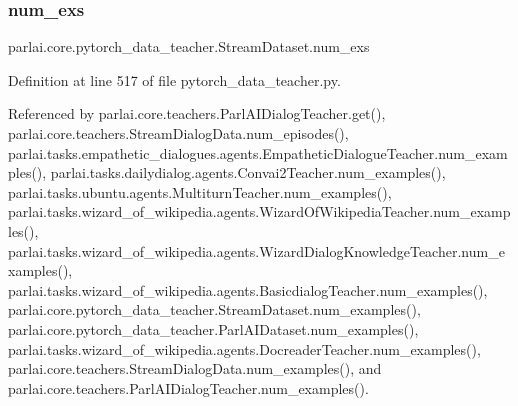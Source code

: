 \mbox{\label{classparlai_1_1core_1_1pytorch__data__teacher_1_1StreamDataset_a2155bdd1c8cd3723c252ea05aa859a8c}} 
\subsubsection{\texorpdfstring{num\+\_\+exs}{num\_exs}}
{\footnotesize\ttfamily parlai.\+core.\+pytorch\+\_\+data\+\_\+teacher.\+Stream\+Dataset.\+num\+\_\+exs}



Definition at line 517 of file pytorch\+\_\+data\+\_\+teacher.\+py.



Referenced by parlai.\+core.\+teachers.\+Parl\+A\+I\+Dialog\+Teacher.\+get(), parlai.\+core.\+teachers.\+Stream\+Dialog\+Data.\+num\+\_\+episodes(), parlai.\+tasks.\+empathetic\+\_\+dialogues.\+agents.\+Empathetic\+Dialogue\+Teacher.\+num\+\_\+examples(), parlai.\+tasks.\+dailydialog.\+agents.\+Convai2\+Teacher.\+num\+\_\+examples(), parlai.\+tasks.\+ubuntu.\+agents.\+Multiturn\+Teacher.\+num\+\_\+examples(), parlai.\+tasks.\+wizard\+\_\+of\+\_\+wikipedia.\+agents.\+Wizard\+Of\+Wikipedia\+Teacher.\+num\+\_\+examples(), parlai.\+tasks.\+wizard\+\_\+of\+\_\+wikipedia.\+agents.\+Wizard\+Dialog\+Knowledge\+Teacher.\+num\+\_\+examples(), parlai.\+tasks.\+wizard\+\_\+of\+\_\+wikipedia.\+agents.\+Basicdialog\+Teacher.\+num\+\_\+examples(), parlai.\+core.\+pytorch\+\_\+data\+\_\+teacher.\+Stream\+Dataset.\+num\+\_\+examples(), parlai.\+core.\+pytorch\+\_\+data\+\_\+teacher.\+Parl\+A\+I\+Dataset.\+num\+\_\+examples(), parlai.\+tasks.\+wizard\+\_\+of\+\_\+wikipedia.\+agents.\+Docreader\+Teacher.\+num\+\_\+examples(), parlai.\+core.\+teachers.\+Stream\+Dialog\+Data.\+num\+\_\+examples(), and parlai.\+core.\+teachers.\+Parl\+A\+I\+Dialog\+Teacher.\+num\+\_\+examples().

\mbox{\label{classparlai_1_1core_1_1pytorch__data__teacher_1_1StreamDataset_a131f7e729877877d35c4f5f74263e0d0}} 
